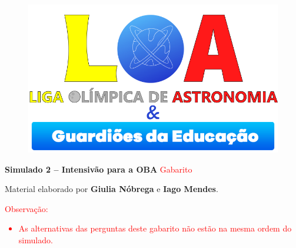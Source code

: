 \documentclass[a4paper, 12pt]{article}
\newcommand{\red}[1]{\textcolor{red}{#1}}
\begin{document}
    \begin{figure}
        \centering
        \href{https://ligaolimpicadeastronomia.com.br/}{\includegraphics[scale=0.6]{./img/logos.png}}
    \end{figure}
    \begin{center}
        \begin{large}
            \textbf{Simulado 2 -- Intensivão para a OBA}
            \linebreak \red{Gabarito}
        \end{large}
        \end{center}
    \begin{flushright}
        Material elaborado por \textbf{Giulia Nóbrega} e \textbf{Iago Mendes}.
    \end{flushright}
    \red{Observação: \begin{itemize}
        \item As alternativas das perguntas deste gabarito não estão na mesma ordem do simulado.
    \end{itemize}}
\end{document}
